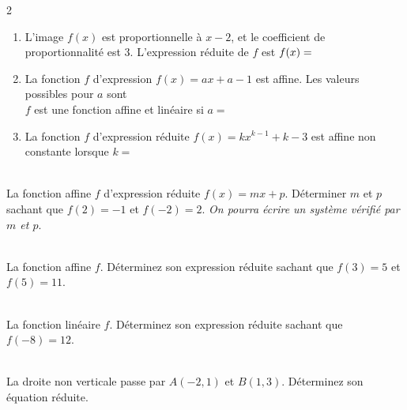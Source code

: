 \documentclass[main.tex]{subfiles}
\begin{document}
\begin{exercise}
\begin{spacing}{2}
\begin{enumerate}[leftmargin=*,label={\arabic*)}]
\item L'image $f(x)$ est proportionnelle à $x-2$, et le coefficient de proportionnalité est $3$. L'expression réduite de $f$ est $f(x)=\dotfill$
\item La fonction $f$ d'expression $f(x)=ax+a-1$ est affine. Les valeurs possibles pour $a$ sont \dotfill \\
$f$ est une fonction affine et linéaire si $a=$\dotfill 
\item La fonction $f$ d'expression réduite $f(x)=kx^{k-1}+k-3$ est affine non constante lorsque $k=$\dotfill 
\end{enumerate}
\end{spacing}
\end{exercise}
\vspace{-2em}
\begin{exercise}\hfill \\
La fonction affine $f$ d'expression réduite $f(x)=mx+p$. Déterminer $m$ et $p$ sachant que $f(2)=-1$ et $f(-2)=2$. \emph{On pourra écrire un système vérifié par $m$ et $p$}.
\end{exercise} 
\begin{exercise}\hfill \\
La fonction affine $f$. Déterminez son expression réduite sachant que  $f(3)=5$ et $f(5)=11$. 
\end{exercise}
\begin{exercise}\hfill \\
	La fonction linéaire $f$. Déterminez son expression réduite sachant que   $f(-8)=12$.
\end{exercise} 
\begin{exercise}\hfill \\
La droite non verticale passe par $A(-2,1)$ et $B(1,3)$. Déterminez son équation réduite.
\end{exercise} 
\end{document}
